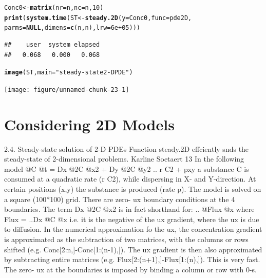 \documentclass{tufte-handout}\usepackage[]{graphicx}\usepackage[]{xcolor}
\makeatletter
\newcommand{\hlnum}[1]{\textcolor[rgb]{0.686,0.059,0.569}{#1}}%
\newcommand{\hlstr}[1]{\textcolor[rgb]{0.192,0.494,0.8}{#1}}%
\newcommand{\hlstd}[1]{\textcolor[rgb]{0.345,0.345,0.345}{#1}}%
\newcommand{\hlkwa}[1]{\textcolor[rgb]{0.161,0.373,0.58}{\textbf{#1}}}%
\newcommand{\hlkwb}[1]{\textcolor[rgb]{0.69,0.353,0.396}{#1}}%
\newcommand{\hlkwc}[1]{\textcolor[rgb]{0.333,0.667,0.333}{#1}}%
\newcommand{\hlkwd}[1]{\textcolor[rgb]{0.737,0.353,0.396}{\textbf{#1}}}%
\newenvironment{kframe}{%
 \def\at@end@of@kframe{}%
 \ifinner\ifhmode%
  \def\at@end@of@kframe{\end{minipage}}%
  \begin{minipage}{\columnwidth}%
 \fi\fi%
 \def\FrameCommand##1{\hskip\@totalleftmargin \hskip-\fboxsep
 \colorbox{shadecolor}{##1}\hskip-\fboxsep
     \hskip-\linewidth \hskip-\@totalleftmargin \hskip\columnwidth}%
 \MakeFramed {\advance\hsize-\width
   \@totalleftmargin\z@ \linewidth\hsize
   \@setminipage}}%
 {\par\unskip\endMakeFramed%
 \at@end@of@kframe}
\newenvironment{knitrout}{}{} %
\makeatother
\begin{document}
\begin{knitrout}
\color{fgcolor}\begin{kframe}
\begin{alltt}
\hlstd{Conc0} \hlkwb{<-} \hlkwd{matrix}\hlstd{(}\hlkwc{nr} \hlstd{= n,} \hlkwc{nc} \hlstd{= n,} \hlnum{10}\hlstd{)}
\hlkwd{print}\hlstd{(}\hlkwd{system.time}\hlstd{(ST} \hlkwb{<-} \hlkwd{steady.2D}\hlstd{(}\hlkwc{y} \hlstd{= Conc0,} \hlkwc{func} \hlstd{= pde2D,}
\hlkwc{parms} \hlstd{=} \hlkwa{NULL}\hlstd{,} \hlkwc{dimens} \hlstd{=} \hlkwd{c}\hlstd{(n, n),} \hlkwc{lrw} \hlstd{=} \hlnum{6e+05}\hlstd{)))}
\end{alltt}
\begin{verbatim}
##    user  system elapsed 
##   0.068   0.000   0.068
\end{verbatim}
\end{kframe}
\end{knitrout}

\begin{knitrout}
\color{fgcolor}\begin{kframe}
\begin{alltt}
\hlkwd{image}\hlstd{(ST,} \hlkwc{main} \hlstd{=} \hlstr{"steady-state 2-D PDE"}\hlstd{)}
\end{alltt}
\end{kframe}
\texttt{[image: figure/unnamed-chunk-23-1]} 
\end{knitrout}


\section{Considering 2D Models}

2.4. Steady-state solution of 2-D PDEs
Function steady.2D effciently snds the steady-state of 2-dimensional problems.
Karline Soetaert 13
In the following model
@C
@t
= Dx 
@2C
@x2 + Dy 
@2C
@y2
.. r  C2 + pxy
a substance C is consumed at a quadratic rate (r C2), while dispersing in X- and Y-direction.
At certain positions (x,y) the substance is produced (rate p).
The model is solved on a square (100*100) grid. There are zero-
ux boundary conditions at
the 4 boundaries.
The term Dx  @2C
@x2 is in fact shorthand for:
..
@Flux
@x
where
Flux = ..Dx 
@C
@x
i.e. it is the negative of the 
ux gradient, where the 
ux is due to diffusion.
In the numerical approximation fo the 
ux, the concentration gradient is approximated as the
subtraction of two matrices, with the columns or rows shifted (e.g. Conc[2:n,]-Conc[1:(n-1),]).
The 
ux gradient is then also approximated by subtracting entire matrices
(e.g. Flux[2:(n+1),]-Flux[1:(n),]). This is very fast. The zero-
ux at the boundaries is
imposed by binding a column or row with 0-s.
\end{document}

